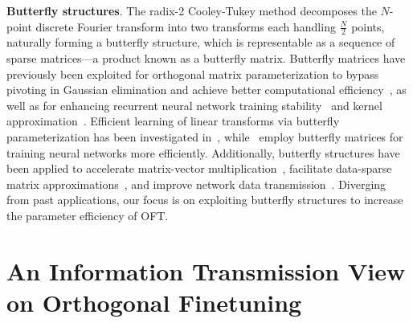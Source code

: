 \textbf{Butterfly structures}. The radix-2 Cooley-Tukey method decomposes the $N$-point discrete Fourier transform into two transforms each handling $\frac{N}{2}$ points, naturally forming a butterfly structure, which is representable as a sequence of sparse matrices—a product known as a butterfly matrix. Butterfly matrices have previously been exploited for orthogonal matrix parameterization to bypass pivoting in Gaussian elimination and achieve better computational efficiency~\cite{parker1995random}, as well as for enhancing recurrent neural network training stability~\cite{jing2017tunable} and kernel approximation~\cite{munkhoeva2018quadrature}. Efficient learning of linear transforms via butterfly parameterization has been investigated in~\cite{dao2019learning,dao2019kaleidoscope}, while~\cite{chen2022pixelated,dao2022monarch} employ butterfly matrices for training neural networks more efficiently. Additionally, butterfly structures have been applied to accelerate matrix-vector multiplication~\cite{michielssen1996multilevel,o2010algorithm}, facilitate data-sparse matrix approximations~\cite{li2015butterfly}, and improve network data transmission~\cite{klasing1994broadcasting,li2003linear,rajasingh2016transmission}. Diverging from past applications, our focus is on exploiting butterfly structures to increase the parameter efficiency of OFT.

\section{An Information Transmission View on Orthogonal Finetuning}

